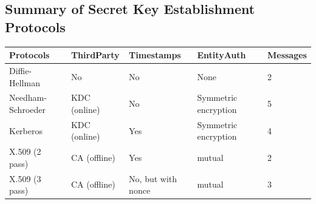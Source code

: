 \documentclass{article}
\begin{document}
\subsection{Summary of Secret Key Establishment Protocols}
\begin{center}
  \begin{tabular}{|p{2.5cm}|p{2.5cm}|p{2.5cm}|p{4cm}|p{2cm}|}
    \hline
    Protocols & ThirdParty & Timestamps & EntityAuth & Messages \\ \hline
    Diffie-Hellman & No & No & None & 2 \\ \hline
    Needham-Schroeder & KDC (online) & No & Symmetric encryption & 5 \\ \hline
    Kerberos & KDC (online) & Yes & Symmetric encryption & 4 \\ \hline
    X.509 (2 pass) & CA (offline) & Yes & mutual & 2 \\ \hline
    X.509 (3 pass) & CA (offline) & No, but with nonce & mutual & 3 \\
    \hline
  \end{tabular}
\end{center}
\end{document}

